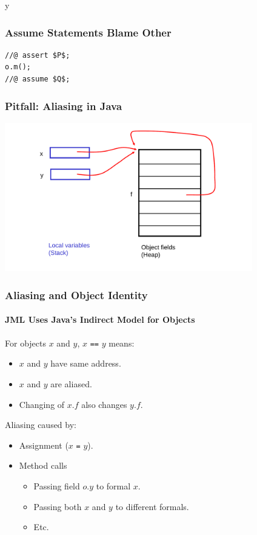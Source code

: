 \if y\MAKEHANDOUTS \documentclass[compress,landscape,handout]{beamer}
\begin{document}
\begin{frame}[fragile]
\frametitle{Assume Statements Blame Other}

\begin{lstlisting}[mathescape=true]
//@ assert $P$;
o.m();
//@ assume $Q$;
\end{lstlisting}

\end{frame}

\begin{frame}
\frametitle{Pitfall: Aliasing in Java}
\includegraphics[width=4.25in]{aliasxy}
\end{frame}

\begin{frame}
\frametitle{Aliasing and Object Identity}
\framesubtitle{JML Uses Java's Indirect Model for Objects}

For objects $x$ and $y$, $x$ \texttt{==} $y$ means:
\begin{itemize}
\item
$x$ and $y$ have same address.

\item
$x$ and $y$ are aliased.

\item
Changing of $x.f$ also changes $y.f$.
\end{itemize}

Aliasing caused by:
\begin{itemize}
\item
Assignment ($x$ \texttt{=} $y$).

\item
Method calls 
\begin{itemize}
\item
Passing field $o.y$ to formal $x$.

\item
Passing both $x$ and $y$ to different formals.

\item
Etc.
\end{itemize}
\end{itemize}
\end{frame}
\end{document}
